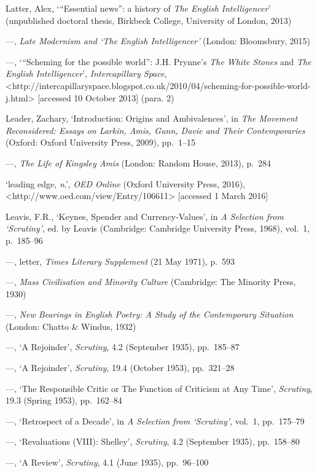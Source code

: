 \documentclass[]{article}
\begin{document}
Latter, Alex, ‘“Essential news”: a history of \emph{The English
Intelligencer}’ (unpublished doctoral thesis, Birkbeck College,
University of London, 2013)

—, \emph{Late Modernism and ‘The English Intelligencer’} (London:
Bloomsbury, 2015)

—, ‘“Scheming for the possible world”: J.H. Prynne’s \emph{The White
Stones} and \emph{The English Intelligencer}’, \emph{Intercapillary
Space},\\
\textless{}http://intercapillaryspace.blogspot.co.uk/2010/04/scheming-for-possible-world-j.html\textgreater{}
{[}accessed 10 October 2013{]} (para. 2)

Leader, Zachary, ‘Introduction: Origins and Ambivalences’, in \emph{The
Movement Reconsidered: Essays on Larkin, Amis, Gunn, Davie and Their
Contemporaries} (Oxford: Oxford University Press, 2009), pp.~1–15

—, \emph{The Life of Kingsley Amis} (London: Random House, 2013), p.~284

‘leading edge, \emph{n}.’, \emph{OED Online} (Oxford University Press,
2016),\\
\textless{}http://www.oed.com/view/Entry/106611\textgreater{}
{[}accessed 1 March 2016{]}

Leavis, F.R., ‘Keynes, Spender and Currency-Values’, in \emph{A
Selection from ‘Scrutiny’}, ed. by Leavis (Cambridge: Cambridge
University Press, 1968), vol.~1, p.~185–96

—, letter, \emph{Times Literary Supplement} (21 May 1971), p.~593

—, \emph{Mass Civilisation and Minority Culture} (Cambridge: The
Minority Press, 1930)

—, \emph{New Bearings in English Poetry: A Study of the Contemporary
Situation} (London: Chatto \& Windus, 1932)

—, ‘A Rejoinder’, \emph{Scrutiny}, 4.2 (September 1935), pp.~185–87

—, ‘A Rejoinder’, \emph{Scrutiny}, 19.4 (October 1953), pp.~321–28

—, ‘The Responsible Critic or The Function of Criticism at Any Time’,
\emph{Scrutiny}, 19.3 (Spring 1953), pp.~162–84

—, ‘Retrospect of a Decade’, in \emph{A Selection from ‘Scrutiny’},
vol.~1, pp.~175–79

—, ‘Revaluations (VIII): Shelley’, \emph{Scrutiny}, 4.2 (September
1935), pp.~158–80

—, ‘A Review’, \emph{Scrutiny}, 4.1 (June 1935), pp.~96–100
\end{document}
